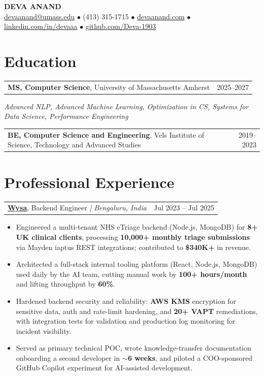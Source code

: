 \documentclass[letterpaper,11pt]{article}
\makeatletter
\newcommand{\eduItem}[3]{%
  \begin{tabular*}{\textwidth}{@{}l@{\extracolsep{\fill}}r@{}}
    \textbf{#1}, #2 & #3 \\
  \end{tabular*}\par
}
\newcommand{\expItem}[4]{%
  \vspace{3pt}
  \begin{tabular*}{\textwidth}{@{}l@{\extracolsep{\fill}}r@{}}
    \textbf{#1}, #2 \textit{| #3} & #4 \\
  \end{tabular*}\par\vspace{-2pt}
}
\makeatother
\begin{document}
\begin{center}
    {\fontsize{18}{20}\selectfont\bfseries DEVA ANAND}\\ \vspace{3pt}
    {\small
    \href{mailto:devaanand@umass.edu}{devaanand@umass.edu}
    \enspace$\bullet$\enspace
    (413) 315-1715
    \enspace$\bullet$\enspace
    \href{https://devaanand.com}{devaanand.com}
    \enspace$\bullet$\enspace
    \href{https://linkedin.com/in/devaaa/}{linkedin.com/in/devaaa}
    \enspace$\bullet$\enspace
    \href{https://github.com/Deva-1903}{github.com/Deva-1903}}
\end{center}
\vspace{-6pt}

\section{Education}
\eduItem{MS, Computer Science}{University of Massachusetts Amherst}{2025--2027}
{\small\textit{Advanced NLP, Advanced Machine Learning, Optimization in CS, Systems for Data Science, Performance Engineering}}\par
\vspace{3pt}
\eduItem{BE, Computer Science and Engineering}{Vels Institute of Science, Technology and Advanced Studies}{2019--2023}

\section{Professional Experience}

\expItem{\href{https://www.wysa.io}{Wysa}}{Backend Engineer}{Bengaluru, India}{Jul 2023 -- Jul 2025}
\begin{itemize}
  \item Engineered a multi-tenant NHS eTriage backend (Node.js, MongoDB) for \textbf{8+ UK clinical clients}, processing \textbf{10{,}000+ monthly triage submissions} via Mayden iaptus REST integrations; contributed to \textbf{\$340K+} in revenue.
  \item Architected a full-stack internal tooling platform (React, Node.js, MongoDB) used daily by the AI team, cutting manual work by \textbf{100+ hours/month} and lifting throughput by \textbf{60\%}.
  \item Hardened backend security and reliability: \textbf{AWS KMS} encryption for sensitive data, auth and rate-limit hardening, and \textbf{20+ VAPT} remediations, with integration tests for validation and production log monitoring for incident visibility.
  \item Served as primary technical POC, wrote knowledge-transfer documentation onboarding a second developer in \textbf{$\sim$6 weeks}, and piloted a COO-sponsored GitHub Copilot experiment for AI-assisted development.
\end{itemize}
\end{document}
